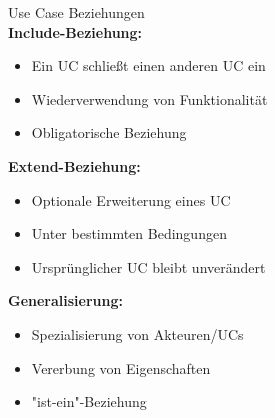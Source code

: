 \begin{definition}{Use Case Beziehungen}\\
\textbf{Include-Beziehung:}
\begin{itemize}
    \item Ein UC schließt einen anderen UC ein
    \item Wiederverwendung von Funktionalität
    \item Obligatorische Beziehung
\end{itemize}

\textbf{Extend-Beziehung:}
\begin{itemize}
    \item Optionale Erweiterung eines UC
    \item Unter bestimmten Bedingungen
    \item Ursprünglicher UC bleibt unverändert
\end{itemize}

\textbf{Generalisierung:}
\begin{itemize}
    \item Spezialisierung von Akteuren/UCs
    \item Vererbung von Eigenschaften
    \item "ist-ein"-Beziehung
\end{itemize}
\end{definition}

